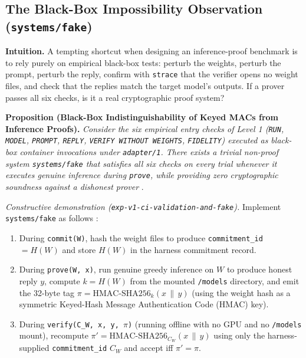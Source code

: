 \documentclass[11pt,letterpaper]{article}
\begin{document}
\subsection{The Black-Box Impossibility Observation (\texttt{systems/\allowbreak{}fake})}

\textbf{Intuition.} A tempting shortcut when designing an inference-proof benchmark is to rely purely on empirical black-box tests: perturb the weights, perturb the prompt, perturb the reply, confirm with \texttt{strace} that the verifier opens no weight files, and check that the replies match the target model's outputs. If a prover passes all six checks, is it a real cryptographic proof system?

\textbf{Proposition (Black-Box Indistinguishability of Keyed MACs from Inference Proofs).} \textit{Consider the six empirical entry checks of Level 1 (\texttt{RUN}, \texttt{MODEL}, \texttt{PROMPT}, \texttt{REPLY}, \texttt{VERIFY WITHOUT WEIGHTS}, \texttt{FIDELITY}) executed as black-box container invocations under \texttt{adapter/\allowbreak{}1}. There exists a trivial non-proof system \texttt{systems/\allowbreak{}fake} that satisfies all six checks on every trial whenever it executes genuine inference during \texttt{prove}, while providing zero cryptographic soundness against a dishonest prover} \cite{iproofs2026}.

\textit{Constructive demonstration (\texttt{exp-\allowbreak{}v1-\allowbreak{}ci-\allowbreak{}validation-\allowbreak{}and-\allowbreak{}fake}).} Implement \texttt{systems/\allowbreak{}fake} as follows \cite{iproofs2026}:

\begin{enumerate}
\item During \texttt{commit(W)}, hash the weight files to produce \texttt{commitment\_\allowbreak{}id} $= H(W)$ and store $H(W)$ in the harness commitment record.
\item During \texttt{prove(W, x)}, run genuine greedy inference on $W$ to produce honest reply $y$, compute $k = H(W)$ from the mounted \texttt{/\allowbreak{}models} directory, and emit the 32-byte tag $\pi = \text{HMAC-SHA256}_k(x \,\|\,\allowbreak  y)$ (using the weight hash as a symmetric Keyed-Hash Message Authentication Code (HMAC) key).
\item During \texttt{verify(C\_\allowbreak{}W, x, y, $\pi$)} (running offline with no GPU and no \texttt{/\allowbreak{}models} mount), recompute $\pi' = \text{HMAC-SHA256}_{C_W}(x \,\|\,\allowbreak  y)$ using only the harness-supplied \texttt{commitment\_\allowbreak{}id} $C_W$ and accept iff $\pi' = \pi$.
\end{enumerate}
\end{document}
